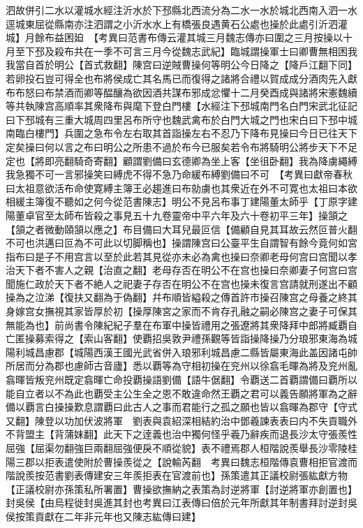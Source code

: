 泗故併引二水以灌城水經注沂水於下邳縣北西流分為二水一水於城北西南入泗一水逕城東屈從縣南亦注泗謂之小沂水水上有橋張良遇黄石公處也操於此處引沂泗灌城】月餘布益困廹　【考異曰范書布傳云灌其城三月魏志傳亦曰圍之三月按操以十月至下邳及殺布共在一季不可言三月今從魏志武紀】臨城謂操軍士曰卿曹無相困我我當自首於明公【首式救翻】陳宫曰逆賊曹操何等明公今日降之【降戶江翻下同】若卵投石豈可得全也布將侯成亡其名馬已而復得之諸將合禮以賀成成分酒肉先入獻布布怒曰布禁酒而卿等醖釀為欲因酒共謀布邪成忿懼十二月癸酉成與諸將宋憲魏續等共執陳宫高順率其衆降布與麾下登白門樓【水經注下邳城南門名白門宋武北征記曰下邳城有三重大城周四里呂布所守也魏武禽布於白門大城之門也宋白曰下邳中城南臨白樓門】兵圍之急布令左右取其首詣操左右不忍乃下降布見操曰今日已往天下定矣操曰何以言之布曰明公之所患不過於布今已服矣若令布將騎明公將步天下不足定也【將即亮翻騎奇寄翻】顧謂劉備曰玄德卿為坐上客【坐徂卧翻】我為降虜繩縛我急獨不可一言邪操笑曰縛虎不得不急乃命緩布縛劉備曰不可　【考異曰獻帝春秋曰太祖意欲活布命使寛縛主簿王必趨進曰布勍虜也其衆近在外不可寛也太祖曰本欲相緩主簿復不聽如之何今從范書陳志】明公不見呂布事丁建陽董太師乎【丁原字建陽董卓官至太師布皆殺之事見五十九卷靈帝中平六年及六十卷初平三年】操頷之【頷之者微動頤頷以應之】布目備曰大耳兒最叵信【備顧自見其耳故云然叵普火翻不可也洪邁曰叵為不可此以切脚稱也】操謂陳宫曰公臺平生自謂智有餘今竟何如宮指布曰是子不用宫言以至於此若其見從亦未必為禽也操曰奈卿老母何宫曰宫聞以孝治天下者不害人之親【治直之翻】老母存否在明公不在宫也操曰奈卿妻子何宫曰宫聞施仁政於天下者不絶人之祀妻子存否在明公不在宫也操未復言宫請就刑遂出不顧操為之泣涕【復扶又翻為于偽翻】幷布順皆縊殺之傳首許市操召陳宫之母養之終其身嫁宫女撫視其家皆厚於初【操厚陳宮之家而不肯存孔融之嗣必陳宫之妻子可保其無能為也】前尚書令陳紀紀子羣在布軍中操皆禮用之張遼將其衆降拜中郎將臧覇自亡匿操募索得之【索山客翻】使覇招吳敦尹禮孫觀等皆詣操降操乃分琅邪東海為城陽利城昌慮郡【城陽西漢王國光武省併入琅邪利城昌慮二縣皆屬東海此盖因諸屯帥所居而分為郡也慮師古音廬】悉以覇等為守相初操在兖州以徐翕毛暉為將及兖州亂翕暉皆叛兖州既定翕暉亡命投覇操語劉備【語牛倨翻】令覇送二首覇謂備曰覇所以能自立者以不為此也覇受主公生全之恩不敢違命然王覇之君可以義告願將軍為之辭備以覇言白操操歎息謂覇曰此古人之事而君能行之孤之願也皆以翕暉為郡守【守式又翻】陳登以功加伏波將軍　劉表與袁紹深相結約治中鄧羲諫表表曰内不失貢職外不背盟主【背蒲妺翻】此天下之逹義也治中獨何怪乎羲乃辭疾而退長沙太守張羨性屈強【屈渠勿翻強巨兩翻屈強便戾不順從貌】表不禮焉郡人桓階說羨舉長沙零陵桂陽三郡以拒表遣使附於曹操羨從之【說輸芮翻　考異曰魏志桓階傳袁曹相拒官渡而階說羨按范書劉表傳建安三年羨拒表在官渡前也】孫策遣其正議校尉張紘獻方物【正議校尉亦孫策私所署置】曹操欲撫納之表策為討逆將軍【討逆將軍亦創置也】封吳侯【由烏程徙封吳進其封也考異曰江表傳曰倍於元年所獻其年制書拜討逆封吳侯按策貢獻在二年非元年也又陳志紘傳曰建】


